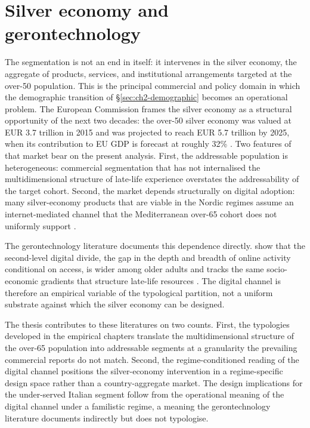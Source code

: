 \section{Silver economy and gerontechnology}
\label{sec:ch2-silver-economy}

The segmentation is not an end in itself: it intervenes in the silver economy, the aggregate of products, services, and institutional arrangements targeted at the over-50 population. This is the principal commercial and policy domain in which the demographic transition of \S\ref{sec:ch2-demographic} becomes an operational problem. The European Commission frames the silver economy as a structural opportunity of the next two decades: the over-50 silver economy was valued at EUR 3.7 trillion in 2015 and was projected to reach EUR 5.7 trillion by 2025, when its contribution to EU GDP is forecast at roughly 32\% \citep{ec_silver_economy_2018}. Two features of that market bear on the present analysis. First, the addressable population is heterogeneous: commercial segmentation that has not internalised the multidimensional structure of late-life experience overstates the addressability of the target cohort. Second, the market depends structurally on digital adoption: many silver-economy products that are viable in the Nordic regimes assume an internet-mediated channel that the Mediterranean over-65 cohort does not uniformly support \citep{oecd2023}.

The gerontechnology literature documents this dependence directly. \citet{hargittai2017} show that the second-level digital divide, the gap in the depth and breadth of online activity conditional on access, is wider among older adults and tracks the same socio-economic gradients that structure late-life resources \citep{campens2024}. The digital channel is therefore an empirical variable of the typological partition, not a uniform substrate against which the silver economy can be designed.

The thesis contributes to these literatures on two counts. First, the typologies developed in the empirical chapters translate the multidimensional structure of the over-65 population into addressable segments at a granularity the prevailing commercial reports do not match. Second, the regime-conditioned reading of the digital channel positions the silver-economy intervention in a regime-specific design space rather than a country-aggregate market. The design implications for the under-served Italian segment follow from the operational meaning of the digital channel under a familistic regime, a meaning the gerontechnology literature documents indirectly but does not typologise.

